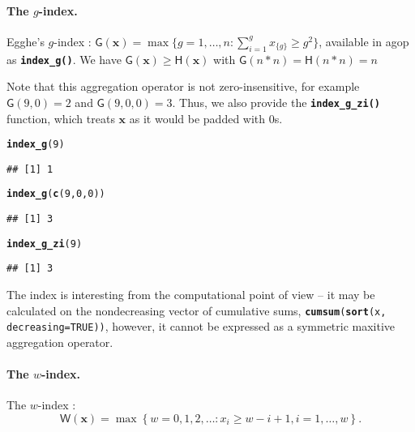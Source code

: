 \documentclass[11pt]{article}\usepackage{graphicx, color}
\makeatletter
\newcommand{\hlfunctioncall}[1]{\textcolor[rgb]{0.501960784313725,0,0.329411764705882}{\textbf{#1}}}%
\newcommand{\hlargument}[1]{\textcolor[rgb]{0.690196078431373,0.250980392156863,0.0196078431372549}{#1}}%
\newenvironment{kframe}{%
 \def\at@end@of@kframe{}%
 \ifinner\ifhmode%
  \def\at@end@of@kframe{\end{minipage}}%
  \begin{minipage}{\columnwidth}%
 \fi\fi%
 \def\FrameCommand##1{\hskip\@totalleftmargin \hskip-\fboxsep
 \colorbox{shadecolor}{##1}\hskip-\fboxsep
     \hskip-\linewidth \hskip-\@totalleftmargin \hskip\columnwidth}%
 \MakeFramed {\advance\hsize-\width
   \@totalleftmargin\z@ \linewidth\hsize
   \@setminipage}}%
 {\par\unskip\endMakeFramed%
 \at@end@of@kframe}
\newenvironment{knitrout}{}{} %
\newcommand{\package}[1]{\textsf{#1}\xspace}
\newcommand{\Rfunc}[1]{\texttt{\hlfunctioncall{#1}}}
\newcommand{\argument}[1]{\texttt{\hlargument{#1}}}
\newcommand{\vect}[1]{{\mathbf{#1}}}
\newcommand{\func}[1]{{\mathsf{#1}}}
\theoremstyle{remark}
\theoremstyle{definition}
\makeatother
\begin{document}
\paragraph{The $g$-index.}
Egghe's $g$-index \cite{Egghe2006:g}:
$\func{G}(\vect{x})=\max\{g=1,\dots,n: \sum_{i=1}^g x_{\{g\}}\ge g^2\}$,
available in \package{agop} as \Rfunc{index\_g()}.
We have $\func{G}(\vect{x})\ge \func{H}(\vect{x})$
with $\func{G}(n\ast n)=\func{H}(n\ast n)=n$


Note that this aggregation operator is not zero-insensitive,
for example $\func{G}(9,0)=2$ and $\func{G}(9,0,0)=3$.
Thus, we also provide the \Rfunc{index\_g\_zi()} function,
which treats $\vect{x}$ as it would be padded with $0$s.


\begin{knitrout}\small
{}\color{fgcolor}\begin{kframe}
\begin{alltt}
\hlfunctioncall{index_g}(9)
\end{alltt}
\begin{verbatim}
## [1] 1
\end{verbatim}
\begin{alltt}
\hlfunctioncall{index_g}(\hlfunctioncall{c}(9,0,0))
\end{alltt}
\begin{verbatim}
## [1] 3
\end{verbatim}
\begin{alltt}
\hlfunctioncall{index_g_zi}(9)
\end{alltt}
\begin{verbatim}
## [1] 3
\end{verbatim}
\end{kframe}
\end{knitrout}


The index is interesting from the computational point of view --
it may be calculated on the nondecreasing vector of cumulative sums,
\texttt{\Rfunc{cumsum}(\Rfunc{sort}(x, \argument{decreasing=}TRUE))},
however, it cannot be expressed as a symmetric maxitive aggregation operator.


\paragraph{The $w$-index.}
 The $w$-index \cite{Woeginger2008:axiomatich}:
\begin{equation}\label{Eq:IndexW}
\func{W}(\vect{x}) = \max\left\{w=0,1,2,\ldots: {x}_{i} \ge w-i+1, i=1,\dots,w\right\}.
\end{equation}
\end{document}
